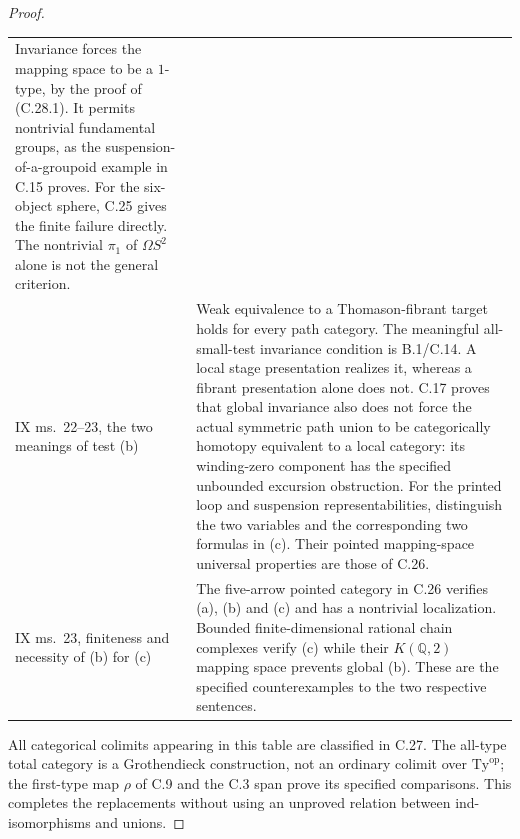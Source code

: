 \begin{proof}
\begin{longtable}{@{}p{}p{}@{}}
Invariance forces the mapping space to be a $1$-type, by the
proof of (C.28.1). It permits nontrivial fundamental groups,
as the suspension-of-a-groupoid example in C.15 proves. For the
six-object sphere, C.25 gives the finite failure directly. The
nontrivial $\pi_1$ of $\Omega S^2$ alone is not the general
criterion.\\
IX ms.~22--23, the two meanings of test (b) &
Weak equivalence to a Thomason-fibrant target holds for every
path category. The meaningful all-small-test invariance
condition is B.1/C.14. A local stage presentation realizes it,
whereas a fibrant presentation alone does not. C.17 proves that
global invariance also does not force the actual symmetric path
union to be categorically homotopy equivalent to a local category:
its winding-zero component has the specified unbounded excursion
obstruction. For the printed
loop and suspension representabilities, distinguish the two
variables and the corresponding two formulas in (c). Their
pointed mapping-space universal properties are those of C.26.\\
IX ms.~23, finiteness and necessity of (b) for (c) &
The five-arrow pointed category in C.26 verifies (a), (b) and
(c) and has a nontrivial localization. Bounded finite-dimensional
rational chain complexes verify (c) while their
$K(\mathbb Q,2)$ mapping space prevents global (b). These are
the specified counterexamples to the two respective sentences.\\
\bottomrule
\end{longtable}
\normalsize

All categorical colimits appearing in this table are classified
in C.27. The all-type total category is a Grothendieck construction,
not an ordinary colimit over $\mathrm{Ty}^{\mathrm{op}}$;
the first-type map $\rho$ of C.9 and the C.3 span prove its
specified comparisons. This completes the replacements without
using an unproved relation between ind-isomorphisms and unions.
\end{proof}
